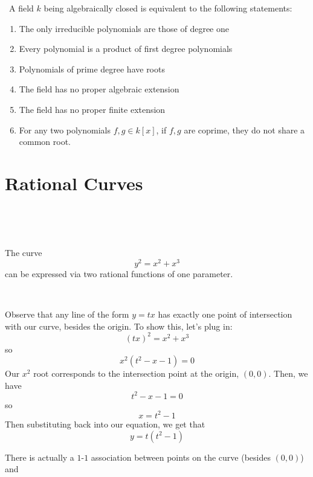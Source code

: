 \documentclass{article}
\begin{document}
\begin{lemma}
	\
	A field $k$ being algebraically closed is equivalent to the following statements:

	\begin{enumerate}
		\item The only irreducible polynomials are those of degree one
		\item Every polynomial is a product of first degree polynomials
		\item Polynomials of prime degree have roots
		\item The field has no proper algebraic extension
		\item The field has no proper finite extension
		\item For any two polynomials $f, g \in k[x]$, if $f,g$ are coprime, they do not share a common root.
	\end{enumerate}
\end{lemma}

\section{Rational Curves}
\

\begin{example}
\

The curve $$y^2 = x^2 + x^3$$can be expressed via two rational functions of one parameter.
\end{example}

\begin{customproof}
\

Observe that any line of the form $y = tx$ has exactly one point of intersection with our curve, besides the origin. To show this, let's plug in: $$(tx)^2 = x^2 + x^3$$so$$x^2(t^2 - x - 1) = 0$$Our $x^2$ root corresponds to the intersection point at the origin, $(0,0)$. Then, we have $$t^2 - x - 1 = 0$$so$$x = t^2 - 1$$Then substituting back into our equation, we get that $$y = t(t^2-1)$$

There is actually a $1$-$1$ association between points on the curve (besides $(0,0)$) and 
\end{customproof}
\end{document}

